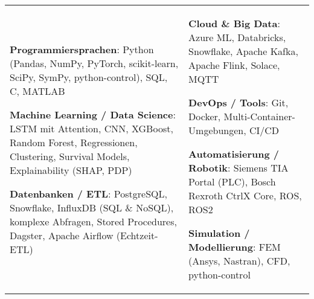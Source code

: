 {\scriptsize
\begin{tabularx}{\textwidth}{@{}X X@{}}
\begin{minipage}[t]{\linewidth}
\textbf{\textcolor{linksoft}{Programmiersprachen}}: 
Python (Pandas, NumPy, PyTorch, scikit-learn, SciPy, SymPy, python-control), SQL, C, MATLAB \par
\vspace{0.5em}

\textbf{\textcolor{linksoft}{Machine Learning / Data Science}}: 
LSTM mit Attention, CNN, XGBoost, Random Forest, Regressionen, Clustering, Survival Models, Explainability (SHAP, PDP) \par \vspace{0.5em}

\textbf{\textcolor{linksoft}{Datenbanken / ETL}}: 
PostgreSQL, Snowflake, InfluxDB (SQL \& NoSQL), komplexe Abfragen, Stored Procedures, Dagster, Apache Airflow (Echtzeit-ETL)
\end{minipage}
&
\begin{minipage}[t]{\linewidth}
\textbf{\textcolor{linksoft}{Cloud \& Big Data}}: 
Azure ML, Databricks, Snowflake, Apache Kafka, Apache Flink, Solace, MQTT \par \vspace{0.5em}

\textbf{\textcolor{linksoft}{DevOps / Tools}}: 
Git, Docker, Multi-Container-Umgebungen, CI/CD \par \vspace{0.5em}

\textbf{\textcolor{linksoft}{Automatisierung / Robotik}}: 
Siemens TIA Portal (PLC), Bosch Rexroth CtrlX Core, ROS, ROS2
 \par \vspace{0.5em}

\textbf{\textcolor{linksoft}{Simulation / Modellierung}}: 
FEM (Ansys, Nastran), CFD, python-control
\end{minipage}
\\
\end{tabularx}
}
